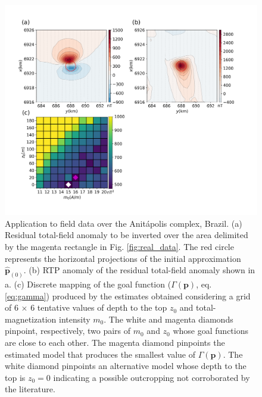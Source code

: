 \begin{figure}
    \centering
    \includegraphics[width=\linewidth]{figures/anitapolis_rtp.png}
    \caption{Application to field data over the Anit{\'a}polis complex, Brazil. (a) Residual total-field anomaly to be inverted over the area delimited by the  magenta rectangle in Fig. \ref{fig:real_data}. The red circle represents the horizontal projections 	of the initial approximation 
    $\hat{\mathbf{p}}_{(0)}$.
    (b) RTP anomaly of the  residual total-field anomaly shown in a. 
(c) Discrete mapping of the goal function ($ \Gamma(\mathbf{p})$, eq. \ref{eq:gamma}) produced by the estimates  obtained considering a grid of 6 $\times$ 6 tentative values of 
	   depth to the top $z_0$ and total-magnetization intensity $m_0$. 
	   The white and magenta diamonds pinpoint, respectively, two pairs of $m_0$  and $z_0$
	   whose goal functions are close to each other. The magenta diamond pinpoints the estimated model that produces the smallest value of $\Gamma(\mathbf{p})$.
The white diamond pinpoints an alternative model whose depth to the top is $z_0=0$ indicating a possible outcropping not corroborated by the literature.	 
}
    \label{fig:anitapolis_rtp}
\end{figure}



